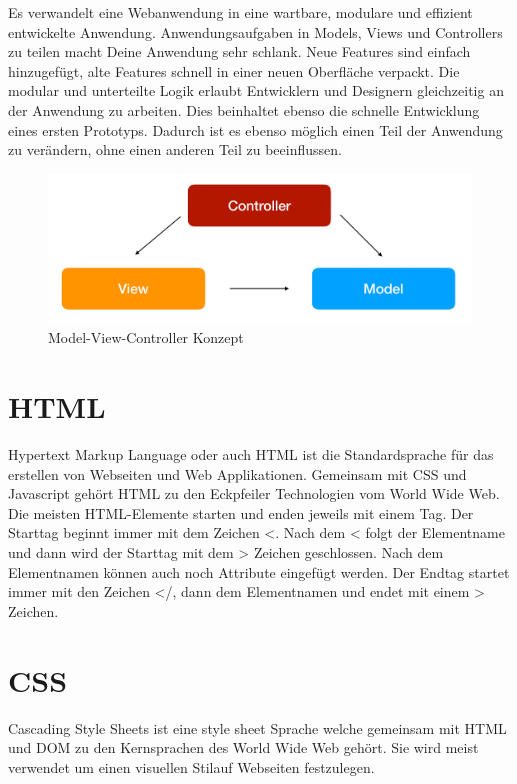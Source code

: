 Es verwandelt eine Webanwendung in eine wartbare, modulare und effizient entwickelte Anwendung. 
Anwendungsaufgaben in Models, Views und Controllers zu teilen macht Deine Anwendung sehr schlank. 
Neue Features sind einfach hinzugefügt, alte Features schnell in einer neuen Oberfläche verpackt. 
Die modular und unterteilte Logik erlaubt Entwicklern und Designern gleichzeitig an der Anwendung zu arbeiten. 
Dies beinhaltet ebenso die schnelle Entwicklung eines ersten Prototyps. 
Dadurch ist es ebenso möglich einen Teil der Anwendung zu verändern, ohne einen anderen Teil zu beeinflussen.
\begin{figure}[H]
\begin{center}
	\includegraphics[scale=.4]{images/MVC.png}
\end{center}
	\caption{Model-View-Controller Konzept}
	\label{fig:sample}
\end{figure}

\section{HTML}
Hypertext Markup Language oder auch HTML ist die Standardsprache für das erstellen von Webseiten und Web Applikationen. Gemeinsam mit CSS und Javascript gehört HTML zu den Eckpfeiler Technologien vom World Wide Web.
Die meisten HTML-Elemente starten und enden jeweils mit einem Tag. Der Starttag beginnt immer mit dem Zeichen <. Nach dem < folgt der Elementname und dann wird der Starttag mit dem > Zeichen geschlossen. Nach dem Elementnamen können auch noch Attribute eingefügt werden.
Der Endtag startet immer mit den Zeichen </, dann dem Elementnamen und endet mit einem > Zeichen.

\section{CSS}
Cascading Style Sheets ist eine style sheet Sprache welche gemeinsam mit HTML und DOM zu den Kernsprachen des World Wide Web gehört.
Sie wird meist verwendet um einen visuellen Stilauf Webseiten festzulegen.

